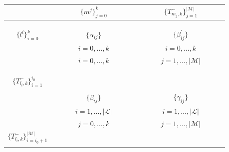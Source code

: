 \documentclass[12pt]{article}
\begin{document}
\begin{center}
\begin{tabular}{c|ccccccc:ccccccc} 
			                   &   & &  &$\big \lbrace  m^j  \big \rbrace_{j=0}^k$ & & & & & & &$\big \lbrace T_{m_j,k}^- \big \rbrace_{j=1}^{\vert \mathcal{M}\vert}$ & &  & \\ \hline
&&&&&&&&&&&&&& \\
&&&&&&&&&&&&&& \\
&&&&&&&&&&&&&& \\
$\big \lbrace  l^i  \big \rbrace_{i=0}^k$ &&&&$\big \lbrace \alpha_{ij} \big \rbrace$&&&&&&&$\big \lbrace \beta^\prime_{ij} \big \rbrace$&&&\\
&&&&$i=0,\dots,k$&&&&&&& $i=0,\dots,k$&&& \\
&&&&$i=0,\dots,k$&&&&&&&$j=1,\dots,\vert \mathcal{M}\vert$&&& \\
&&&&&&&&&&&&&&\\
&&&&&&&&&&&&&&\\ \hdashline
&&&&&&&&&&&&&& \\
$\big \lbrace T_{l_i,k}^- \big \rbrace_{i=1}^{i_0}$ &&&&&&&&&&&&&&\\
&&&&&&&&&&&&&& \\ 
&&&& $\big \lbrace \beta_{ij} \big \rbrace$ &&&&&&&$\big \lbrace \gamma_{ij} \big \rbrace$&&& \\
&&&&$i=1,\dots,\vert \mathcal{L} \vert$&&&&&&&$i=1,\dots,\vert \mathcal{L} \vert$&&& \\ 
&&&&$j=0,\dots,k$&&&&&&&$j=1,\dots,\vert \mathcal{M} \vert$&&& \\ 
$\big \lbrace T_{l_i,k}^- \big \rbrace_{i=i_0+1}^{\vert \mathcal{M}\vert}$ &&&&&&&&&&&&&&\\
&&&&&&&&&&&&&& \\ 
\end{tabular}
\end{center}



\vspace{5in}
\end{document}
